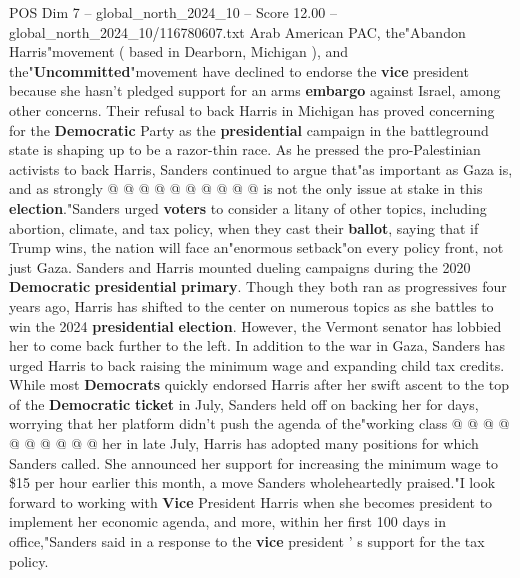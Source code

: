 \begin{textsample}{POS Dim 7 – global\_north\_2024\_10 – Score 12.00 – global\_north\_2024\_10/116780607.txt}
Arab American PAC, the"Abandon Harris"movement ( based in Dearborn, Michigan ), and the"\textbf{Uncommitted}"movement have declined to endorse the \textbf{vice} president because she hasn't pledged support for an arms \textbf{embargo} against Israel, among other concerns.
Their refusal to back Harris in Michigan has proved concerning for the \textbf{Democratic} Party as the \textbf{presidential} campaign in the battleground state is shaping up to be a razor-thin race.
As he pressed the pro-Palestinian activists to back Harris, Sanders continued to argue that"as important as Gaza is, and as strongly @ @ @ @ @ @ @ @ @ @ is not the only issue at stake in this \textbf{election}."Sanders urged \textbf{voters} to consider a litany of other topics, including abortion, climate, and tax policy, when they cast their \textbf{ballot}, saying that if Trump wins, the nation will face an"enormous setback"on every policy front, not just Gaza.
Sanders and Harris mounted dueling campaigns during the 2020 \textbf{Democratic} \textbf{presidential} \textbf{primary}.
Though they both ran as progressives four years ago, Harris has shifted to the center on numerous topics as she battles to win the 2024 \textbf{presidential} \textbf{election}.
However, the Vermont senator has lobbied her to come back further to the left.
In addition to the war in Gaza, Sanders has urged Harris to back raising the minimum wage and expanding child tax credits.
While most \textbf{Democrats} quickly endorsed Harris after her swift ascent to the top of the \textbf{Democratic} \textbf{ticket} in July, Sanders held off on backing her for days, worrying that her platform didn't push the agenda of the"working class @ @ @ @ @ @ @ @ @ @ her in late July, Harris has adopted many positions for which Sanders called.
She announced her support for increasing the minimum wage to \$15 per hour earlier this month, a move Sanders wholeheartedly praised."I look forward to working with \textbf{Vice} President Harris when she becomes president to implement her economic agenda, and more, within her first 100 days in office,"Sanders said in a response to the \textbf{vice} president ' s support for the tax policy.

\end{textsample}
